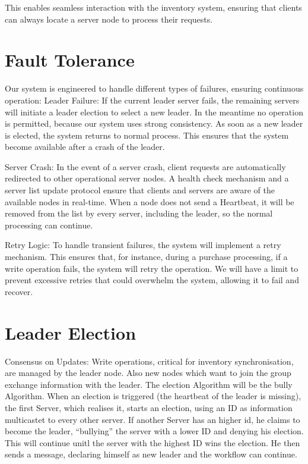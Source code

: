 This enables seamless interaction with the inventory system, ensuring that clients can always locate a server node to process their requests.

\section{Fault Tolerance}\label{sec:FaultTolerance}
Our system is engineered to handle different types of failures, ensuring continuous operation:
Leader Failure: If the current leader server fails, the remaining servers will initiate a leader election to select a new leader. In the meantime no operation is permitted, because our system uses strong consistency. As soon as a new leader is elected, the system returns to normal process.
This ensures that the system become available after a crash of the leader.

Server Crash: In the event of a server crash, client requests are automatically redirected to other operational server nodes. A health check mechanism and a server list update protocol ensure that clients and servers are aware of the available nodes in real-time. When a node does not send a Heartbeat,
it will be removed from the list by every server, including the leader, so the normal processing can continue.

Retry Logic: To handle transient failures, the system will implement a retry mechanism. This ensures that, for instance, during a purchase processing, if a write operation fails, the system will retry the operation. We will have a limit to  prevent excessive retries that could overwhelm the system, allowing it to fail and recover.

\section{Leader Election}\label{sec:Election}
Consensus on Updates: Write operations, critical for inventory synchronisation, are managed by the leader node. Also new nodes which want to join the group exchange information with the leader. The election Algorithm will be the bully Algorithm.
When an election is triggered (the heartbeat of the leader is missing), the first Server, which realises it, starts an election, using an ID as information multicastet to every other server. If another Server has an higher id, he claims to become the leader,
\enquote{bullying} the server with a lower ID and denying his election. This will continue unitl the server with the highest ID wins the election. He then sends a message, declaring himself as new leader and the workflow can continue.

